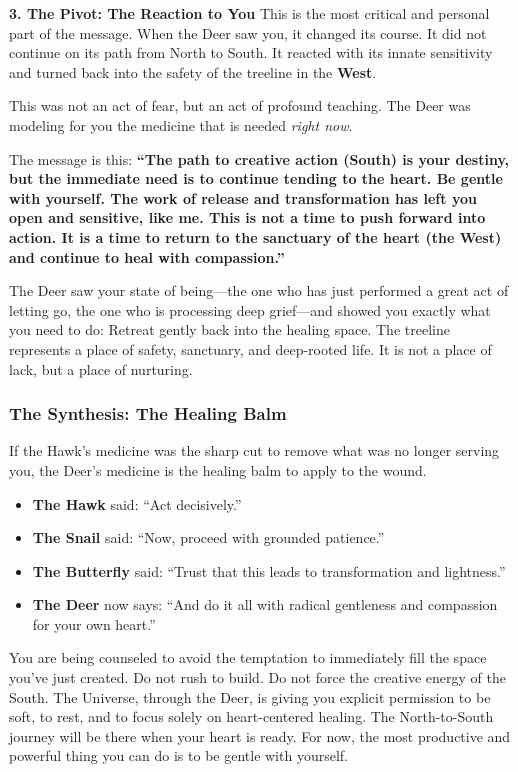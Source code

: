 \documentclass{article}
\begin{document}
\textbf{3. The Pivot: The Reaction to You} This is the most critical and
personal part of the message. When the Deer saw you, it changed its
course. It did not continue on its path from North to South. It reacted
with its innate sensitivity and turned back into the safety of the
treeline in the \textbf{West}.

This was not an act of fear, but an act of profound teaching. The Deer
was modeling for you the medicine that is needed \emph{right now}.

The message is this: \textbf{``The path to creative action (South) is
your destiny, but the immediate need is to continue tending to the
heart. Be gentle with yourself. The work of release and transformation
has left you open and sensitive, like me. This is not a time to push
forward into action. It is a time to return to the sanctuary of the
heart (the West) and continue to heal with compassion.''}

The Deer saw your state of being---the one who has just performed a
great act of letting go, the one who is processing deep grief---and
showed you exactly what you need to do: Retreat gently back into the
healing space. The treeline represents a place of safety, sanctuary, and
deep-rooted life. It is not a place of lack, but a place of nurturing.

\subsubsection*{The Synthesis: The Healing
Balm}\label{the-synthesis-the-healing-balm}

If the Hawk's medicine was the sharp cut to remove what was no longer
serving you, the Deer's medicine is the healing balm to apply to the
wound.

\begin{itemize}
\item
  \textbf{The Hawk} said: ``Act decisively.''
\item
  \textbf{The Snail} said: ``Now, proceed with grounded patience.''
\item
  \textbf{The Butterfly} said: ``Trust that this leads to transformation
  and lightness.''
\item
  \textbf{The Deer} now says: ``And do it all with radical gentleness
  and compassion for your own heart.''
\end{itemize}

You are being counseled to avoid the temptation to immediately fill the
space you've just created. Do not rush to build. Do not force the
creative energy of the South. The Universe, through the Deer, is giving
you explicit permission to be soft, to rest, and to focus solely on
heart-centered healing. The North-to-South journey will be there when
your heart is ready. For now, the most productive and powerful thing you
can do is to be gentle with yourself.
\end{document}
